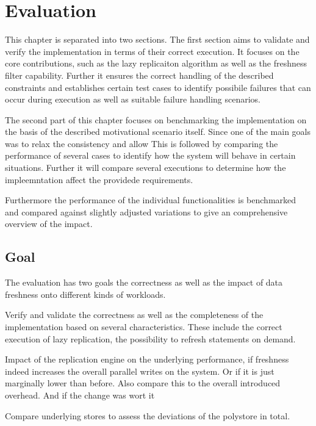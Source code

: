 \chapter{Evaluation}
\label{c:evaluation}

This chapter is separated into two sections. The first section aims to validate and verify the implementation in terms of their
correct execution. It focuses on the core contributions, such as the lazy replicaiton algorithm as well as the freshness filter capability.
Further it ensures the correct handling of the described constraints and establishes certain test cases to identify possibile failures that can occur 
during execution as well as suitable failure handling scenarios.

The second part of this chapter focuses on benchmarking the implementation on the basis of the described motivational scenario itself.
Since one of the main goals was to relax the consistency and allow 
This is followed by comparing the performance of several cases to identify how the system will behave in certain situations.
Further it will compare several executions to determine how the impleemntation affect the providede requirements.

Furthermore the performance of the individual functionalities is benchmarked and compared against slightly adjusted variations 
to give an comprehensive overview of the impact.


\section{Goal}
The evaluation has two goals the correctness as well as the impact of data freshness onto different kinds of workloads.

Verify and validate the correctness as well as the completeness of the implementation based on several characteristics.
These include the correct execution of lazy replication, the possibility to refresh statements on demand.

Impact of the replication engine on the underlying performance, if freshness indeed increases the overall parallel writes on the system.
Or if it is just marginally lower than before. Also compare this to the overall introduced overhead. And if the change was wort it



Compare underlying stores to assess the deviations of the polystore in total.

